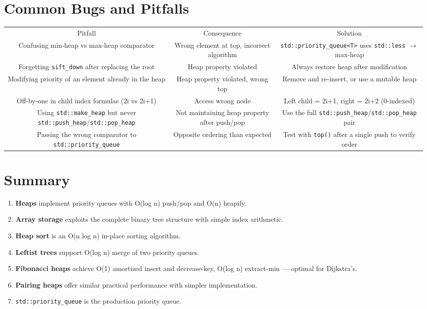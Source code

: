 \section{Common Bugs and Pitfalls}

\begin{center}
\begin{tabular}{ccc}
\toprule
Pitfall & Consequence & Solution \\
Confusing min-heap vs max-heap comparator & Wrong element at top, incorrect algorithm & \texttt{std::priority\_queue<T>} uses \texttt{std::less} $\to $ max-heap \\
Forgetting \texttt{sift\_down} after replacing the root & Heap property violated & Always restore heap after modification \\
Modifying priority of an element already in the heap & Heap property violated, wrong top & Remove and re-insert, or use a mutable heap \\
Off-by-one in child index formulas (2i vs 2i+1) & Access wrong node & Left child = 2i+1, right = 2i+2 (0-indexed) \\
Using \texttt{std::make\_heap} but never \texttt{std::push\_heap}/\texttt{std::pop\_heap} & Not maintaining heap property after push/pop & Use the full \texttt{std::push\_heap}/\texttt{std::pop\_heap} pair \\
Passing the wrong comparator to \texttt{std::priority\_queue} & Opposite ordering than expected & Test with \texttt{top()} after a single push to verify order \\

\bottomrule
\end{tabular}
\end{center}
\section{Summary}

\begin{enumerate}
\item \textbf{Heaps} implement priority queues with O(log n) push/pop and O(n) heapify.
\item \textbf{Array storage} exploits the complete binary tree structure with simple index arithmetic.
\item \textbf{Heap sort} is an O(n log n) in-place sorting algorithm.
\item \textbf{Leftist trees} support O(log n) merge of two priority queues.
\item \textbf{Fibonacci heaps} achieve O(1) amortized insert and decrease-key, O(log n) extract-min — optimal for Dijkstra's.
\item \textbf{Pairing heaps} offer similar practical performance with simpler implementation.
\item \texttt{std::priority\_queue} is the production priority queue.
\end{enumerate}

